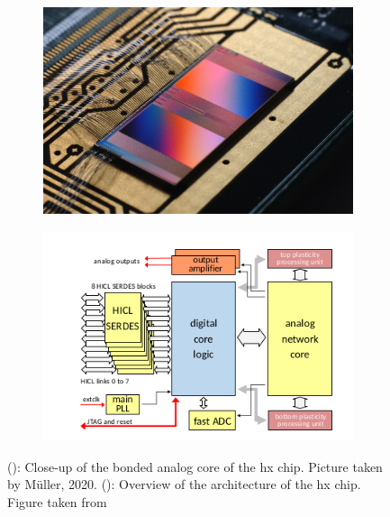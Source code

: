 \begin{figure}
	\begin{subfigure}[c]{0.5\textwidth}
		\centering
		\caption{}
		\includegraphics[width=\textwidth]{figures/HXcloseup.JPG}
		\label{hxcloseup}
	\end{subfigure}	
	\begin{subfigure}[c]{0.5\textwidth}
		\centering
		\caption{}
		\includegraphics[width=\textwidth]{figures/HXstructure.png}
		\label{hxstructure}
	\end{subfigure}
	\caption{(): Close-up of the bonded analog core of the \gls{hx} chip. Picture taken by Müller, 2020. (): Overview of the architecture of the \gls{hx} chip. Figure taken from \cite{schemmel2017nmda}}
\end{figure}

